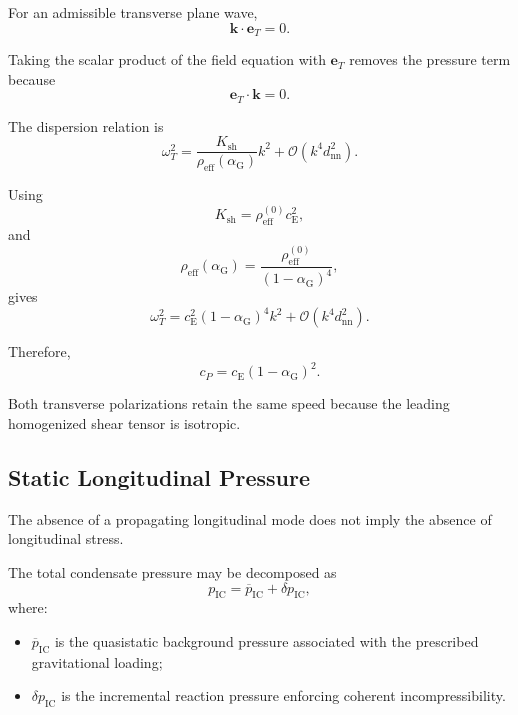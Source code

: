 For an admissible transverse plane wave,
\begin{equation}
    \mathbf{k}\cdot\mathbf{e}_T = 0.
\end{equation}

Taking the scalar product of the field equation with $\mathbf{e}_T$ removes the pressure term because
\begin{equation}
    \mathbf{e}_T\cdot\mathbf{k} = 0.
\end{equation}

The dispersion relation is
\begin{equation}
    \boxed{ \omega_T^2 = \frac{ K_{\mathrm{sh}} }{ \rho_{\mathrm{eff}} \left( \alpha_{\mathrm{G}} \right) } k^2 + \mathcal{O}\left( k^4d_{\mathrm{nn}}^2 \right) }.
\end{equation}

Using
\begin{equation}
    K_{\mathrm{sh}} = \rho_{\mathrm{eff}}^{(0)} c_{\mathrm{E}}^2,
\end{equation}
and
\begin{equation}
    \rho_{\mathrm{eff}} \left( \alpha_{\mathrm{G}} \right) = \frac{ \rho_{\mathrm{eff}}^{(0)} }{ \left( 1-\alpha_{\mathrm{G}} \right)^4 },
\end{equation}
gives
\begin{equation}
    \omega_T^2 = c_{\mathrm{E}}^2 \left( 1-\alpha_{\mathrm{G}} \right)^4 k^2 + \mathcal{O}\left( k^4d_{\mathrm{nn}}^2 \right).
\end{equation}

Therefore,
\begin{equation}
    \boxed{ c_P = c_{\mathrm{E}} \left( 1-\alpha_{\mathrm{G}} \right)^2 }.
\end{equation}

Both transverse polarizations retain the same speed because the leading homogenized shear tensor is isotropic.

\subsection{Static Longitudinal Pressure}

The absence of a propagating longitudinal mode does not imply the absence of longitudinal stress.

The total condensate pressure may be decomposed as
\begin{equation}
    p_{\mathrm{IC}} = \overline{p}_{\mathrm{IC}} + \delta p_{\mathrm{IC}},
\end{equation}
where:
\begin{itemize}
    \item $\overline{p}_{\mathrm{IC}}$ is the quasistatic background pressure associated with the prescribed gravitational loading;
    \item $\delta p_{\mathrm{IC}}$ is the incremental reaction pressure enforcing coherent incompressibility.
\end{itemize}

